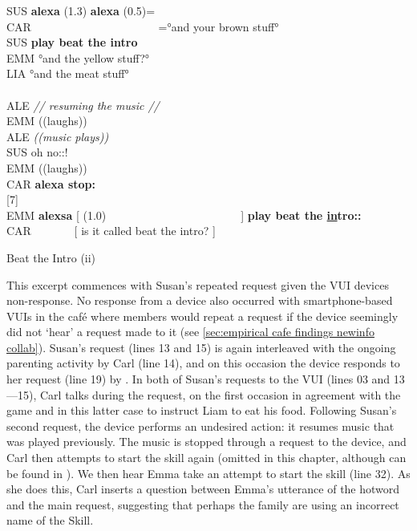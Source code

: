 \begin{inlinefrag}
    \begin{transcript}[13]
        \by SUS {\textbf{alexa} (1.3) \textbf{alexa} (0.5)=} \\
        \by CAR { ~~~~~~~~~~~~~~~~~~~~~~=°and your brown stuff° } \\
        \by SUS {\textbf{play beat the intro}} \\
        \by EMM {°and the yellow stuff?°} \\
        \by LIA {°and the meat stuff°} \\
         \\
        \by ALE {\textit{// resuming the music //}} \\
        \by EMM {((laughs))} \\
        \by ALE {\textit{((music plays))}} \\
        \by SUS {oh no::!} \\
        \by EMM {((laughs))} \\
        \by CAR {\textbf{alexa stop:}} \\
        \later  {\ldots}[7] \\
        \by EMM {\textbf{alexsa} [ (1.0)~~~~~~~~~~~~~~~~~~~~~~~~] \textbf{play beat the \underline{in}tro::}} \\
        \by CAR {~~~~~~~[ is it called beat the intro? ]} \\
    \end{transcript}
    \caption{Beat the Intro (ii)}\label{frag:empirical home findings game-ii}
\end{inlinefrag}

\begin{revisedsubmission}
This excerpt commences with Susan's repeated request given the \ac{VUI} devices non-response.
No response from a device also occurred with smartphone-based \acp{VUI} in the caf\'{e} where members would repeat a request if the device seemingly did not `hear' a request made to it (see \ref{sec:empirical cafe findings newinfo collab}).
Susan's request (lines 13 and 15) is again interleaved with the ongoing parenting activity by Carl (line 14),
and on this occasion the device responds to her request (line 19) by .
In both of Susan's requests to the \ac{VUI} (lines 03 and 13---15), Carl talks during the request, on the first occasion in agreement with the game and in this latter case to instruct Liam to eat his food.
Following Susan's second request, the device performs an undesired action: it resumes music that was played previously.
The music is stopped through a request to the device, and Carl then attempts to start the skill again (omitted in this chapter, although can be found in ).
We then hear Emma take an attempt to start the skill (line 32).
As she does this, Carl inserts a question between Emma's utterance of the hotword and the main request, suggesting that perhaps the family are using an incorrect name of the Skill.
\end{revisedsubmission}

